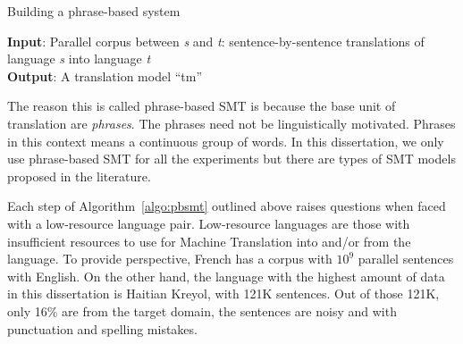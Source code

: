 \begin{algorithm}
\small
\caption{Building a phrase-based system}
\label{algo:pbsmt}
\textbf{Input}: Parallel corpus between \emph{s} and \emph{t}: sentence-by-sentence translations of language \emph{s} into language \emph{t}  \\
\textbf{Output}: A translation model ``tm'' 
\begin{algorithmic}[l]
	 \label{aline:alignments}
	 \label{aline:scores}
	 \label{aline:MERT}
	 \label{aline:decoding}
\end{algorithmic}
\end{algorithm}

The reason this is called phrase-based SMT is because the base unit of translation are \emph{phrases}. The phrases need not be linguistically motivated. Phrases in this context means a continuous group of words. In this dissertation, we only use phrase-based SMT for all the experiments but there are types of SMT models proposed in the literature.~\cite{Chiang:07,Michel:04}

Each step of Algorithm~\ref{algo:pbsmt} outlined above raises questions when faced with a low-resource language pair. Low-resource languages are those with insufficient resources to use for Machine Translation into and/or from the language. To provide perspective, French has a corpus with $10^9$ parallel sentences with English. On the other hand, the language with the highest amount of data in this dissertation is Haitian Kreyol, with 121K sentences. Out of those 121K, only 16\% are from the target domain, the sentences are noisy and with punctuation and spelling mistakes.


